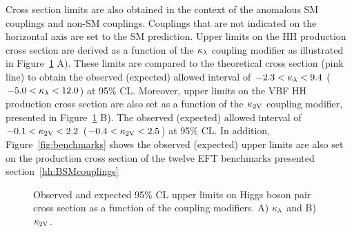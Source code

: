 Cross section limits are also obtained in the context of the anomalous SM couplings and non-SM couplings. Couplings that are not indicated on the horizontal axis are set to the SM prediction. Upper limits on the HH production cross section are derived as a function of the $\kappa_{\lambda}$ coupling modifier as illustrated in Figure~\ref{fig:ULscans} A). These limits are compared to the theoretical cross section (pink line) to obtain the observed (expected) allowed interval of $-2.3<\kappa_{\lambda}<9.4$ ($-5.0<\kappa_{\lambda}<12.0$) at 95\% CL. Moreover, upper limits on the VBF HH production cross section are also set as a function of the $\mathrm{\kappa_{2V} }$ coupling modifier, presented in Figure~\ref{fig:ULscans} B). The observed (expected) allowed interval of $-0.1<\mathrm{\kappa_{2V} }<2.2$ ($-0.4<\mathrm{\kappa_{2V} }<2.5$) at 95\% CL. In addition, Figure~\ref{fig:benchmarks} shows the observed (expected) upper limits are also set on the production cross section of the twelve EFT benchmarks presented section~\ref{hh:BSMcouplings} 

\begin{figure}[!htb]
\captionsetup[subfigure]{justification=centering}
\centering
{}
\caption[Observed and expected 95\% CL upper limits on Higgs boson pair cross section as a function of the coupling modifiers]{\label{fig:ULscans}
Observed and expected 95\% CL upper limits on Higgs boson pair cross section as a function of the coupling modifiers. A) $\kappa_{\lambda}$ and B) $\mathrm{\kappa_{2V} }$.
}
\end{figure}

